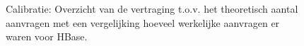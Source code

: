 \begin{figure}[htb!] 
	\centering
	\caption{Calibratie: Overzicht van de vertraging t.o.v. het theoretisch aantal aanvragen met een vergelijking hoeveel werkelijke aanvragen er waren voor HBase. }
	\label{fig:calibratie-queriesperseconde-hbase}
\end{figure}

